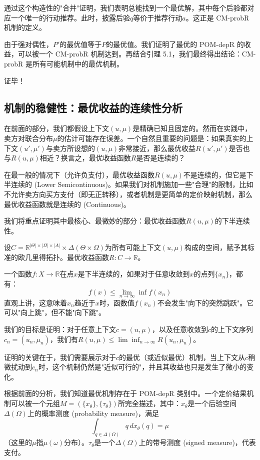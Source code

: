通过这个构造性的"合并"证明，我们表明总能找到一个最优解，其中每个后验都对应一个唯一的行动推荐。此时，披露后验$q$等价于推荐行动$a$。这正是 CM-probR 机制的定义。

由于强对偶性，$P'$的最优值等于$P$的最优值。我们证明了最优的 POM-depR 的收益，可以被一个 CM-probR 机制达到。再结合引理 5.1，我们最终得出结论：CM-probR 是所有可能机制中的最优机制。

证毕！

\subsection{机制的稳健性：最优收益的连续性分析}

在前面的部分，我们都假设上下文$(u,\mu)$是精确已知且固定的。然而在实践中，卖方对联合分布$\mu$的估计可能存在误差。一个自然且重要的问题是：如果真实的上下文$(u',\mu')$与卖方所设想的$(u,\mu)$非常接近，那么最优收益$R(u',\mu')$是否也与$R(u,\mu)$相近？换言之，最优收益函数$R$是否是连续的？

在最一般的情况下（允许负支付），最优收益函数$R(u,\mu)$不是连续的，但它是下半连续的 (Lower Semicontinuous)。如果我们对机制施加一些"合理"的限制，比如不允许卖方向买方支付（即无正转移），或者机制是更简单的定价映射机制，那么最优收益函数就是连续的 (Continuous)。

我们将重点证明其中最核心、最微妙的部分：最优收益函数$R(u,\mu)$的下半连续性。

设$C=\mathbb{R}^{|\Theta|\times |\Omega|\times |A|}\times \Delta(\Theta\times \Omega)$为所有可能上下文$(u,\mu)$构成的空间，赋予其标准的欧几里得拓扑。最优收益函数$R:C\to \mathbb{R}$。

一个函数$f:X\to \mathbb{R}$在点$x$是下半连续的，如果对于任意收敛到$x$的点列$\{x_n\}$，都有：
$$f(x)\leq \lim\limits_{n\to \infty}\inf f(x_n)$$
直观上讲，这意味着$x_n$趋近于$x$时，函数值$f(x_n)$不会发生"向下的突然跳跃"。它可以"向上跳"，但不能"向下跳"。

我们的目标是证明：对于任意上下文$c=(u,\mu)$，以及任意收敛到$c$的上下文序列$c_n = (u_n,\mu_n)$，我们有$R(u,\mu)\leq \lim \inf_{n\to \infty} R(u_n,\mu_n)$。

证明的关键在于，我们需要展示对于$c$的最优（或近似最优）机制，当上下文从$c$稍微扰动到$c_n$时，这个机制仍然是"近似可行的"，并且其收益也只是发生了微小的变化。

根据前面的分析，我们知道最优机制存在于 POM-depR 类别中。一个定价结果机制可以被一个元组$M=(\{x_{\theta}\},\{\tau_{\theta}\})$所完全描述，其中：$x_\theta$是一个后验空间$\Delta(\Omega)$上的概率测度 (probability measure)，满足$$\int_{q\in \Delta(\Omega)}q \, dx_{\theta}(q) = \mu$$（这里的$\mu$指$\mu(\omega)$分布）。$\tau_\theta$是一个$\Delta(\Omega)$上的带号测度 (signed measure)，代表支付。

